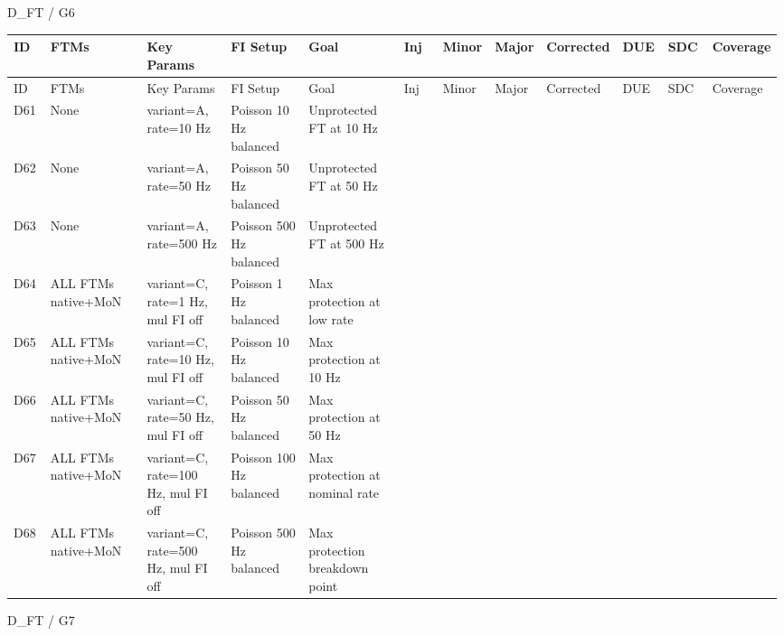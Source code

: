 D\_FT / G6

\begin{longtable}{|p{0.05\linewidth}|p{0.14\linewidth}|p{0.12\linewidth}|p{0.12\linewidth}|p{0.14\linewidth}|p{0.06\linewidth}|p{0.06\linewidth}|p{0.06\linewidth}|p{0.06\linewidth}|p{0.06\linewidth}|p{0.06\linewidth}|p{0.06\linewidth}|}
\hline
ID & FTMs & Key Params & FI Setup & Goal & Inj & Minor & Major & Corrected & DUE & SDC & Coverage \\
\hline
\endfirsthead
\hline
ID & FTMs & Key Params & FI Setup & Goal & Inj & Minor & Major & Corrected & DUE & SDC & Coverage \\
\hline
\endhead
D61 & None & variant=A, rate=10 Hz & Poisson 10 Hz \textbar{} balanced & Unprotected FT at 10 Hz &  &  &  &  &  &  &  \\
\hline
D62 & None & variant=A, rate=50 Hz & Poisson 50 Hz \textbar{} balanced & Unprotected FT at 50 Hz &  &  &  &  &  &  &  \\
\hline
D63 & None & variant=A, rate=500 Hz & Poisson 500 Hz \textbar{} balanced & Unprotected FT at 500 Hz &  &  &  &  &  &  &  \\
\hline
D64 & ALL FTMs native+MoN & variant=C, rate=1 Hz, mul FI off & Poisson 1 Hz \textbar{} balanced & Max protection at low rate &  &  &  &  &  &  &  \\
\hline
D65 & ALL FTMs native+MoN & variant=C, rate=10 Hz, mul FI off & Poisson 10 Hz \textbar{} balanced & Max protection at 10 Hz &  &  &  &  &  &  &  \\
\hline
D66 & ALL FTMs native+MoN & variant=C, rate=50 Hz, mul FI off & Poisson 50 Hz \textbar{} balanced & Max protection at 50 Hz &  &  &  &  &  &  &  \\
\hline
D67 & ALL FTMs native+MoN & variant=C, rate=100 Hz, mul FI off & Poisson 100 Hz \textbar{} balanced & Max protection at nominal rate &  &  &  &  &  &  &  \\
\hline
D68 & ALL FTMs native+MoN & variant=C, rate=500 Hz, mul FI off & Poisson 500 Hz \textbar{} balanced & Max protection breakdown point &  &  &  &  &  &  &  \\
\hline
\end{longtable}

D\_FT / G7

